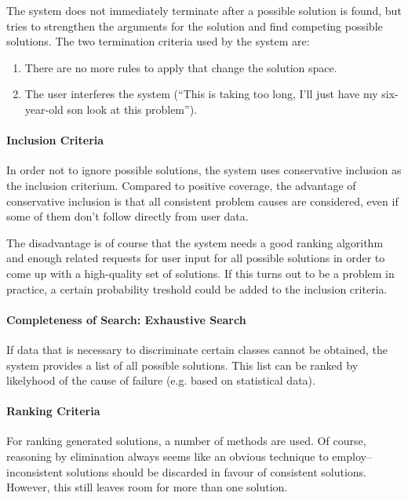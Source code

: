 \documentclass[a4paper,11pt]{article}
\begin{document}
The system does not immediately terminate after a possible solution is found,
but tries to strengthen the arguments for the solution and find competing
possible solutions. The two termination criteria used by the system are:
\begin{enumerate}
\item There are no more rules to apply that change the solution space.
\item The user interferes the system (``This is taking too long, I'll just
  have my six-year-old son look at this problem'').
\end{enumerate}

\paragraph{Inclusion Criteria}

In order not to ignore possible solutions, the system uses conservative
inclusion as the inclusion criterium. Compared to positive coverage, the
advantage of conservative inclusion is that all consistent problem causes are
considered, even if some of them don't follow directly from user data.

The disadvantage is of course that the system needs a good ranking algorithm
and enough related requests for user input for all possible solutions in order
to come up with a high-quality set of solutions. If this turns out to be a
problem in practice, a certain probability treshold could be added to the
inclusion criteria.

\paragraph{Completeness of Search: Exhaustive Search}

If data that is necessary to discriminate certain classes cannot be obtained,
the system provides a list of all possible solutions. This list can be ranked
by likelyhood of the cause of failure (e.g. based on statistical data).

\paragraph{Ranking Criteria}

For ranking generated solutions, a number of methods are used. Of course,
reasoning by elimination always seems like an obvious technique to
employ--inconsistent solutions should be discarded in favour of consistent
solutions. However, this still leaves room for more than one solution.
\end{document}
